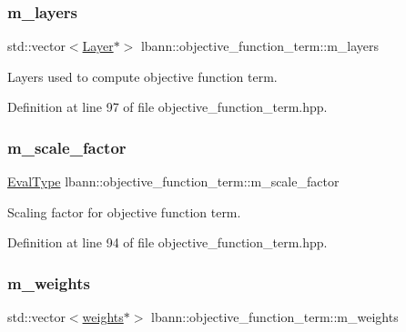 \subsubsection{\texorpdfstring{m\+\_\+layers}{m\_layers}}
{\footnotesize\ttfamily std\+::vector$<$\hyperlink{classlbann_1_1Layer}{Layer}$\ast$$>$ lbann\+::objective\+\_\+function\+\_\+term\+::m\+\_\+layers\hspace{0.3cm}{\ttfamily [protected]}}

Layers used to compute objective function term. 

Definition at line 97 of file objective\+\_\+function\+\_\+term.\+hpp.

\mbox{\label{classlbann_1_1objective__function__term_a59a544b8ff0455ed5091de3bf0d81c3c}} 
\subsubsection{\texorpdfstring{m\+\_\+scale\+\_\+factor}{m\_scale\_factor}}
{\footnotesize\ttfamily \hyperlink{base_8hpp_a3266f5ac18504bbadea983c109566867}{Eval\+Type} lbann\+::objective\+\_\+function\+\_\+term\+::m\+\_\+scale\+\_\+factor\hspace{0.3cm}{\ttfamily [protected]}}

Scaling factor for objective function term. 

Definition at line 94 of file objective\+\_\+function\+\_\+term.\+hpp.

\mbox{\label{classlbann_1_1objective__function__term_a1d601c29153ae9cb54c585887608f2bf}} 
\subsubsection{\texorpdfstring{m\+\_\+weights}{m\_weights}}
{\footnotesize\ttfamily std\+::vector$<$\hyperlink{classlbann_1_1weights}{weights}$\ast$$>$ lbann\+::objective\+\_\+function\+\_\+term\+::m\+\_\+weights\hspace{0.3cm}{\ttfamily [protected]}}

